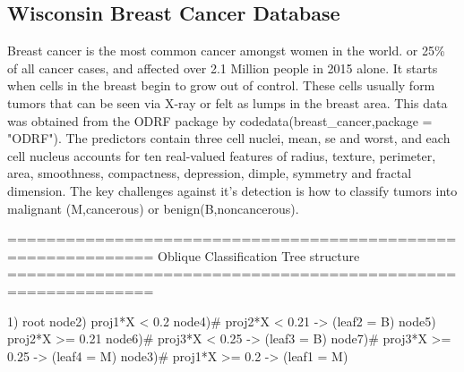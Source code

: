\documentclass[nojss]{jss}
\numberwithin{equation}{section}
\begin{document}
\subsection{Wisconsin Breast Cancer Database}
Breast cancer is the most common cancer amongst women in the world. or 25\% of all cancer cases, and affected over 2.1 Million people in 2015 alone. It starts when cells in the breast begin to grow out of control. These cells usually form tumors that can be seen via X-ray or felt as lumps in the breast area. This data was obtained from the ODRF package by code{data(breast\_cancer,package = "ODRF")}. The predictors contain three cell nuclei, mean, se and worst, and each cell nucleus accounts for ten real-valued features of radius, texture, perimeter, area, smoothness, compactness, depression, dimple, symmetry and fractal dimension. The key challenges against it's detection is how to classify tumors into malignant (M,cancerous) or benign(B,noncancerous).
%
\begin{Schunk}
\begin{Soutput}
============================================================= 
Oblique Classification Tree structure 
=============================================================

1) root
   node2)  proj1*X < 0.2
      node4)# proj2*X < 0.21 -> (leaf2 = B)
      node5)  proj2*X >= 0.21
         node6)# proj3*X < 0.25 -> (leaf3 = B)
         node7)# proj3*X >= 0.25 -> (leaf4 = M)
   node3)# proj1*X >= 0.2 -> (leaf1 = M)
\end{Soutput}
\end{Schunk}
\end{document}
